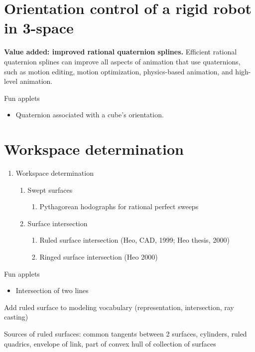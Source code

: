 \documentclass[11pt,titlepage]{article}
\begin{document}
\clearpage

\section{Orientation control of a rigid robot in 3-space}

{\bf Value added: improved rational quaternion splines.}
Efficient rational quaternion splines can improve all aspects of animation that use
quaternions, such as motion editing, motion optimization, physics-based animation,
and high-level animation.

Fun applets
\begin{itemize}
\item Quaternion associated with a cube's orientation.
\end{itemize}
	
\clearpage

\section{Workspace determination}

\begin{enumerate}
\item Workspace determination
\begin{enumerate}
\item Swept surfaces
\begin{enumerate}
\item Pythagorean hodographs for rational perfect sweeps
\end{enumerate}
\item Surface intersection
\begin{enumerate}
\item Ruled surface intersection (Heo, CAD, 1999; Heo thesis, 2000)
\item Ringed surface intersection (Heo 2000)
\end{enumerate}
\end{enumerate}
\end{enumerate}

Fun applets
\begin{itemize}
\item Intersection of two lines
\end{itemize}

Add ruled surface to modeling vocabulary (representation, intersection,
	ray casting)
	
Sources of ruled surfaces: common tangents between 2 surfaces,
	cylinders, ruled quadrics, envelope of link, part of convex hull
	of collection of surfaces
\end{document}
